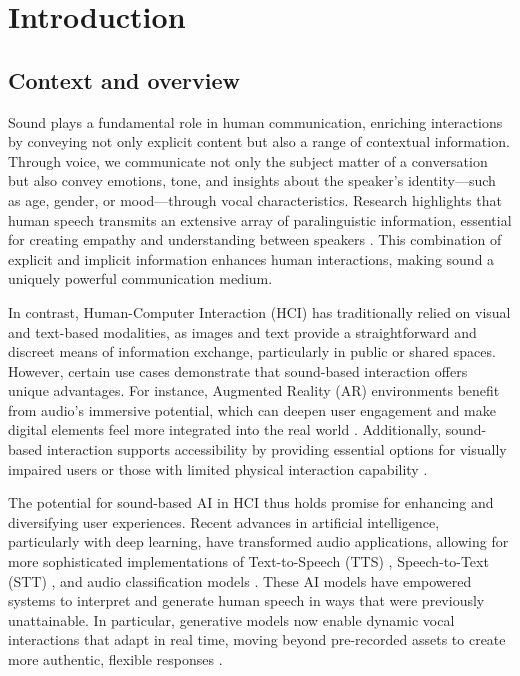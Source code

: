 \section{Introduction}

\subsection{Context and overview}

Sound plays a fundamental role in human communication, enriching interactions by conveying not only explicit content but also a range of contextual information. Through voice, we communicate not only the subject matter of a conversation but also convey emotions, tone, and insights about the speaker’s identity—such as age, gender, or mood—through vocal characteristics. Research highlights that human speech transmits an extensive array of paralinguistic information, essential for creating empathy and understanding between speakers \cite{schuller2013paralinguistics}. This combination of explicit and implicit information enhances human interactions, making sound a uniquely powerful communication medium.

In contrast, Human-Computer Interaction (HCI) has traditionally relied on visual and text-based modalities, as images and text provide a straightforward and discreet means of information exchange, particularly in public or shared spaces. However, certain use cases demonstrate that sound-based interaction offers unique advantages. For instance, Augmented Reality (AR) environments benefit from audio's immersive potential, which can deepen user engagement and make digital elements feel more integrated into the real world \cite{yang2022audio}. Additionally, sound-based interaction supports accessibility by providing essential options for visually impaired users or those with limited physical interaction capability \cite{brock2015interactive}.

The potential for sound-based AI in HCI thus holds promise for enhancing and diversifying user experiences. Recent advances in artificial intelligence, particularly with deep learning, have transformed audio applications, allowing for more sophisticated implementations of Text-to-Speech (TTS) \cite{ren2020fastspeech}, Speech-to-Text (STT) \cite{inaguma2020espnet}, and audio classification models \cite{gemmeke2017audio}. These AI models have empowered systems to interpret and generate human speech in ways that were previously unattainable. In particular, generative models now enable dynamic vocal interactions that adapt in real time, moving beyond pre-recorded assets to create more authentic, flexible responses \cite{brown2020language}.

